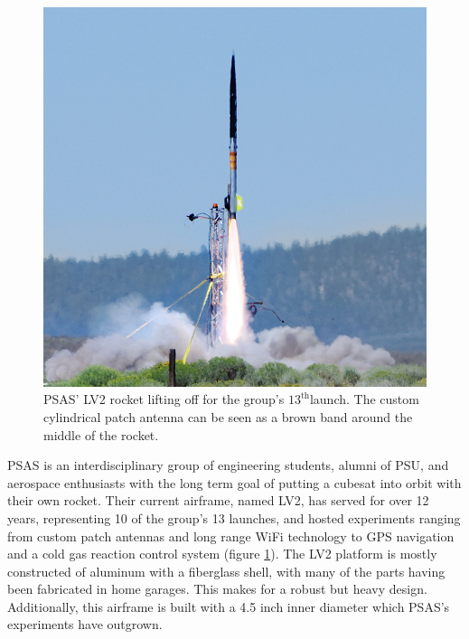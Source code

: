\documentclass{aiaa-tc}%
\begin{document}
\begin{figure}
\centering
\includegraphics[width=\linewidth]{../img/L12-cropped.png}
\caption{PSAS' LV2 rocket lifting off for the group's $13^\text{th}$launch. The custom cylindrical patch antenna can be seen as a brown band around the middle of the rocket.}
\label{fig:L-12}
\end{figure}

PSAS  is an interdisciplinary group of engineering students, alumni of PSU, and aerospace enthusiasts with the long term goal of putting a cubesat into orbit with their own rocket. 
Their current airframe, named LV2, has served for over 12 years, representing 10 of the group's 13 launches, and hosted experiments ranging from custom patch antennas and long range WiFi technology to GPS navigation and a cold gas reaction control system (figure \ref{fig:L-12}). The LV2 platform is mostly constructed of aluminum with a fiberglass shell, with many of the parts having been fabricated in home garages. This makes for a robust but heavy design. Additionally, this airframe is built with a 4.5 inch inner diameter which PSAS's experiments have outgrown. 
\end{document}
